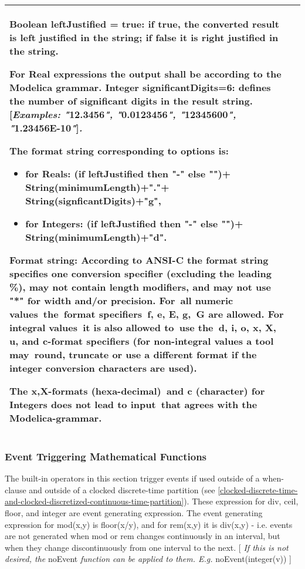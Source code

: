 \begin{longtable}{|p{4.5cm}|p{10.5cm}|}
Boolean leftJustified = true: if true, the converted result is left
justified in the string; if false it is right justified in the string.

For Real expressions the output shall be according to the Modelica
grammar. Integer significantDigits=6: defines the number of significant
digits in the result string. {[}\emph{Examples: "}12.3456\emph{",
"}0.0123456\emph{", "}12345600\emph{", "}1.23456E-10\emph{"}{]}\emph{.}

The format string corresponding to options is:

\begin{itemize}
\item
  for Reals: \newline
  (if leftJustified then "-" else "")+\newline
  String(minimumLength)+"."+\newline
  String(signficantDigits)+"g",
\item
  for Integers: \newline
  (if leftJustified then "-" else "")+\newline
  String(minimumLength)+"d".
\end{itemize}

Format string: According to ANSI-C the format string specifies one
conversion specifier (excluding the leading \%), may not contain length
modifiers, and may not use "*" for width and/or precision. For~all
numeric values~the~format specifiers~f, e, E, g,~G are allowed. For
integral values~it is also allowed to~use the~d, i, o, x, X, u, and
c-format specifiers (for non-integral values a tool may~round, truncate
or use a different format if the integer conversion characters are
used).

The x,X-formats (hexa-decimal)~and c (character) for Integers does not
lead to input~that agrees with the Modelica-grammar.\\ \hline
\end{longtable}

\subsubsection{Event Triggering Mathematical Functions}

The built-in operators in this section trigger events if used outside of
a when-clause and outside of a clocked discrete-time partition (see
\autoref{clocked-discrete-time-and-clocked-discretized-continuous-time-partition}). 
These expression for div, ceil, floor, and integer are
event generating expression. The event generating expression for
mod(x,y) is floor(x/y), and for rem(x,y) it is div(x,y) - i.e. events
are not generated when mod or rem changes continuously in an interval,
  but when they change discontinuously from one interval to the next. {[}
\emph{If this is not desired, the} noEvent \emph{function can be applied
to them. E.g.} noEvent(integer(v)) {]}


